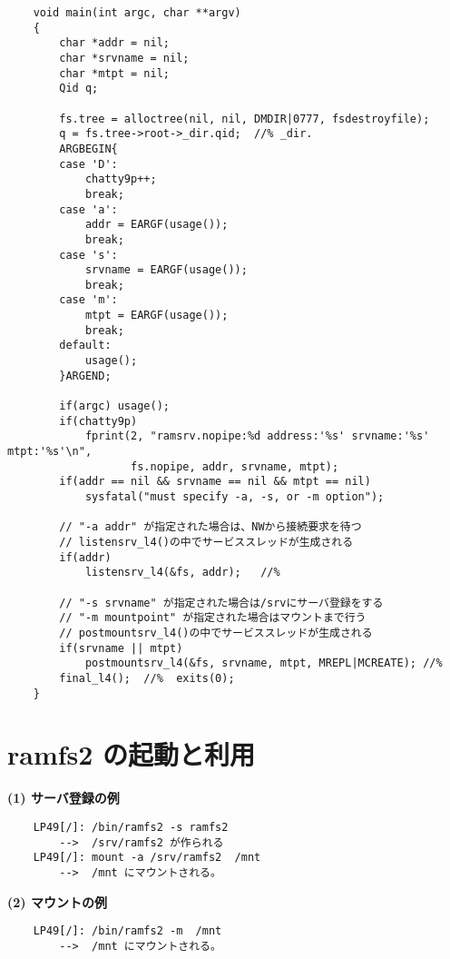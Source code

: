 {{\begin{verbatim}
    void main(int argc, char **argv)
    {
        char *addr = nil;
        char *srvname = nil;
        char *mtpt = nil;
        Qid q;

        fs.tree = alloctree(nil, nil, DMDIR|0777, fsdestroyfile);
        q = fs.tree->root->_dir.qid;  //% _dir.
        ARGBEGIN{
        case 'D':
            chatty9p++;
            break;
        case 'a':
            addr = EARGF(usage());
            break;
        case 's':
            srvname = EARGF(usage());
            break;
        case 'm':
            mtpt = EARGF(usage());
            break;
        default:
            usage();
        }ARGEND;

        if(argc) usage();
        if(chatty9p)
            fprint(2, "ramsrv.nopipe:%d address:'%s' srvname:'%s' mtpt:'%s'\n", 
                   fs.nopipe, addr, srvname, mtpt);
        if(addr == nil && srvname == nil && mtpt == nil)
            sysfatal("must specify -a, -s, or -m option");

        // "-a addr" が指定された場合は、NWから接続要求を待つ
        // listensrv_l4()の中でサービススレッドが生成される
        if(addr)
            listensrv_l4(&fs, addr);   //%

        // "-s srvname" が指定された場合は/srvにサーバ登録をする
        // "-m mountpoint" が指定された場合はマウントまで行う
        // postmountsrv_l4()の中でサービススレッドが生成される
        if(srvname || mtpt)
            postmountsrv_l4(&fs, srvname, mtpt, MREPL|MCREATE); //%
        final_l4();  //%  exits(0);
    }

\end{verbatim}
}

\section{ramfs2 の起動と利用}


{\bf\flushleft  (1) サーバ登録の例}

\begin{verbatim}
    LP49[/]: /bin/ramfs2 -s ramfs2
        -->  /srv/ramfs2 が作られる
    LP49[/]: mount -a /srv/ramfs2  /mnt
        -->  /mnt にマウントされる。
\end{verbatim}

\vspace{4cm}

{\bf\flushleft  (2) マウントの例}

\begin{verbatim}
    LP49[/]: /bin/ramfs2 -m  /mnt
        -->  /mnt にマウントされる。
\end{verbatim}

}
